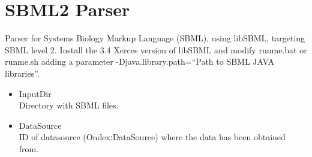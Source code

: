 \section{SBML2 Parser}
Parser for Systems Biology Markup Language (SBML), using libSBML, targeting SBML level 2.
Install the 3.4 Xerces version of libSBML and modify runme.bat or runme.sh adding a parameter -Djava.library.path=``Path to SBML JAVA libraries''.
\begin{itemize}
  \item{InputDir}\\
  Directory with SBML files.
  \item{DataSource}\\
  ID of datasource (Ondex:DataSource) where the data has been obtained from.
\end{itemize}
    
